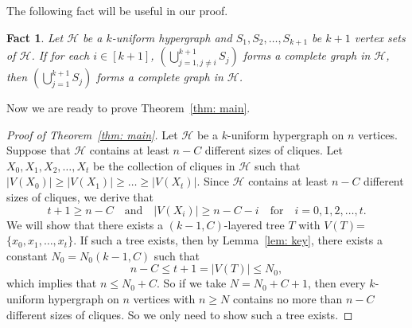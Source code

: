 \documentclass[11pt,a4paper]{article}
\newtheorem{fact}[definition]{Fact}
\begin{document}
The following fact will be useful in our proof.
\begin{fact}\label{fact: clique}
    Let $\mathcal{H}$ be a $k$-uniform hypergraph and $S_1,S_2,\dots, S_{k+1}$ be $k+1$ vertex sets of $\mathcal{H}$. If for each $i\in [k+1]$, $(\bigcup_{j=1,j\ne i}^{k+1}S_j) $ forms a complete graph in $\mathcal{H}$, then $(\bigcup_{j=1}^{k+1}S_j)$ forms  a complete graph in $\mathcal{H}$.
\end{fact}
Now we are ready to prove Theorem~\ref{thm: main}.
\begin{proof}[Proof of Theorem~\ref{thm: main}]
Let $\mathcal{H}$ be a $k$-uniform hypergraph on $n$ vertices. Suppose that $\mathcal{H}$ contains at least $n-C$ different sizes of cliques. 
Let $X_0,X_1,X_2,\dots, X_t$ be the collection of cliques in $\mathcal{H}$ such that $|V(X_0)| \ge |V(X_1)| \ge \dots \ge |V(X_t)|$.
Since $\mathcal{H}$ contains at least $n-C$ different sizes of cliques, 
we derive that 
\[
t+1\ge n-C \quad \text{and} \quad|V(X_i)| \ge n-C-i \quad \text{for}\quad i =0,1,2,\dots ,t.
\]We will show that there exists a $(k-1, C)$-layered tree $T$ with $V(T)$=$\{x_0,x_1,\dots, x_t\}$. If such a tree exists, then by Lemma~\ref{lem: key}, there exists a constant $N_0 = N_0(k-1,C)$ such that 
\[n-C \le t+1=|V(T)|\le N_0,
\] 
which implies that $n \le N_0+C$. So if we take $N =N_0 +C+1$, then every $k$-uniform hypergraph on $n$ vertices with $n\ge N$ contains no more than $n-C$ different
sizes of cliques.
So we only need to show such a tree exists.



\end{proof}
\end{document}
